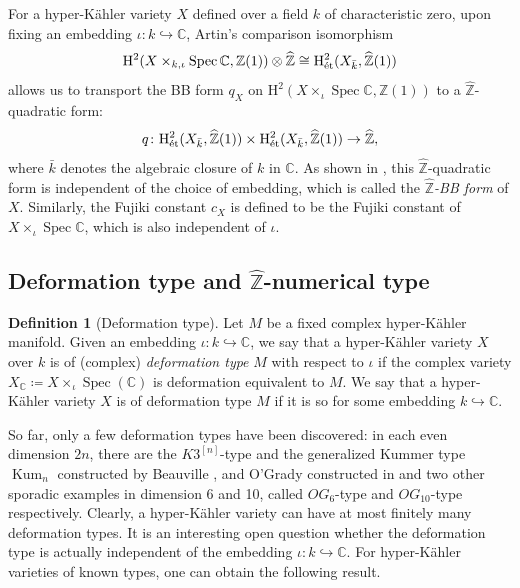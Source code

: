 \documentclass[11pt,reqno,oneside]{amsart}
\numberwithin{equation}{section}
\theoremstyle{definition}
\newtheorem{definition}[theorem]{Definition}
\DeclareMathOperator{\Spec}{Spec}
\DeclareMathOperator{\et}{\Acute{e}t}
\newcommand\rH{\mathrm{H}}
\newcommand{\CC}{\mathbb{C}}
\newcommand{\ZZ}{\mathbb{Z}}
\begin{document}
For a hyper-Kähler variety $X$ defined over a field $k$ of characteristic zero, upon fixing an embedding $\iota\colon k\hookrightarrow \CC$, Artin's comparison isomorphism
\begin{equation}
\rH^2(X\times_{k, \iota}\Spec\CC,\ZZ(1))\otimes \widehat{\ZZ}\cong  \rH^2_{\et} (X_{\bar{k}},\widehat{\ZZ}(1))
\end{equation}
allows us to transport the BB form $q_X$ on $\rH^2(X\times_{\iota}\Spec\CC, \ZZ(1))$ to a $\widehat{\ZZ}$-quadratic form:
$$q\colon\rH^2_{\et} (X_{\bar{k}},\widehat{\ZZ}(1))\times \rH^2_{\et} (X_{\bar{k}},\widehat{\ZZ}(1)) \to \widehat{\ZZ},$$ where $\bar{k}$ denotes the algebraic closure of $k $ in $\CC$.
As shown in \cite[Lemma 4.2.1]{BindtThesis}, this $\widehat{\ZZ}$-quadratic form is independent of the choice of embedding, which is called the \textit{$\widehat{\ZZ}$-BB form} of $X$. Similarly, the Fujiki constant $c_X$ is defined to be the Fujiki constant of $X\times_{\iota}\Spec\CC$, which is also independent of $\iota$.


\subsection{Deformation type and \texorpdfstring{$\widehat{\ZZ}$}{ℤ̂}-numerical type}
\label{subsec:DeformationType}
\begin{definition}[Deformation type]
Let $M$ be a fixed complex hyper-Kähler manifold.
Given an embedding $\iota\colon k\hookrightarrow \CC$, we say that a hyper-Kähler variety $X$ over $k$ is of (complex) \textit{deformation type} $M$ with respect to $\iota$ if the complex variety $X_\CC \coloneqq X\times_{\iota} \Spec (\CC)$ is deformation equivalent to $M$. We say that a hyper-Kähler variety $X$ is of deformation type $M$ if it is so for some embedding $k\hookrightarrow \CC$. 
\end{definition}

So far, only a few deformation types have been discovered: in each even dimension $2n$, there are the $K3^{[n]}$-type and the generalized Kummer type $\operatorname{Kum}_n$ constructed by Beauville \cite{Bea83}, and O'Grady constructed in \cite{OG6} and \cite{OG10} two other sporadic examples in dimension 6 and 10, called $OG_6$-type and $OG_{10}$-type respectively.  Clearly, a hyper-Kähler variety can have at most finitely many deformation types. It is an interesting open question whether the deformation type is actually independent of the embedding $\iota\colon k\hookrightarrow \CC$. For hyper-Kähler varieties of known types, one can obtain the following result.
\end{document}
